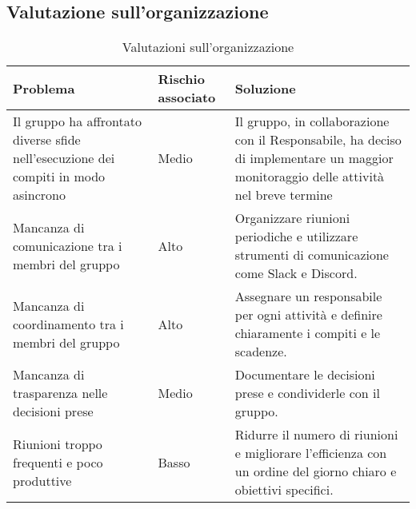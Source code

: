 \subsection{Valutazione sull'organizzazione}
\begin{table}[h!]
    \centering
    \begin{tabularx}{\textwidth}{|X|p{}|X|}\hline
    \rowcolor[HTML]{FFD700}
    \textbf{Problema} & \textbf{Rischio associato} & \textbf{Soluzione} \\ 
    \hline
    Il gruppo ha affrontato diverse sfide nell’esecuzione dei compiti in modo asincrono & Medio
    & Il gruppo, in collaborazione con il Responsabile, ha deciso di implementare un maggior monitoraggio delle
    attività nel breve termine \\
    \hline
    Mancanza di comunicazione tra i membri del gruppo & Alto & 
    Organizzare riunioni periodiche e utilizzare strumenti di comunicazione come Slack e Discord. \\ 
    \hline
    Mancanza di coordinamento tra i membri del gruppo & Alto & 
    Assegnare un responsabile per ogni attività e definire chiaramente i compiti e le scadenze. \\ 
    \hline
    Mancanza di trasparenza nelle decisioni prese & Medio & 
    Documentare le decisioni prese e condividerle con il gruppo. \\ 
    \hline
    Riunioni troppo frequenti e poco produttive & Basso & 
    Ridurre il numero di riunioni e migliorare l'efficienza con un ordine del giorno chiaro e obiettivi specifici. \\
    \hline
    \end{tabularx}
    \caption{Valutazioni sull'organizzazione}
    \label{tab:valutazioni_organizzazione}
\end{table}

